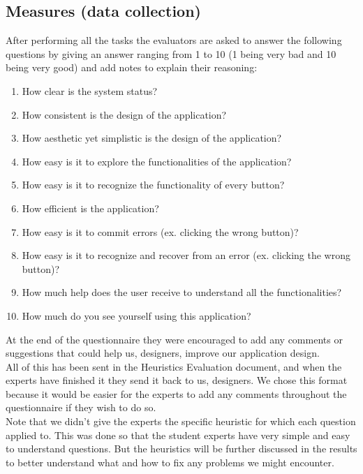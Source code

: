 \documentclass{article}
\begin{document}
    \subsection{Measures (data collection)}
    After performing all the tasks the evaluators are asked to answer the following questions by giving an answer ranging from 1 to 10 (1 being very bad and 10 being very good) and add notes to explain their reasoning:
    \begin{enumerate}
        \item How clear is the system status?
        \item How consistent is the design of the application?
        \item How aesthetic yet simplistic is the design of the application?
        \item How easy is it to explore the functionalities of the application?
        \item How easy is it to recognize the functionality of every button?
        \item How efficient is the application?
        \item How easy is it to commit errors (ex. clicking the wrong button)?
        \item How easy is it to recognize and recover from an error (ex. clicking the wrong button)?
        \item How much help does the user receive to understand all the functionalities?
        \item How much do you see yourself using this application?
    \end{enumerate}
    At the end of the questionnaire they were encouraged to add any comments or suggestions that could help us, designers, improve our application design.\\

    All of this has been sent in the Heuristics Evaluation document, and when the experts have finished it they send it back to us, designers. We chose this format because it would be easier for the experts to add any comments throughout the questionnaire if they wish to do so.\\

    Note that we didn't give the experts the specific heuristic for which each question applied to. This was done so that the student experts have very simple and easy to understand questions. But the heuristics will be further discussed in the results to better understand what and how to fix any problems we might encounter.\\
\end{document}
